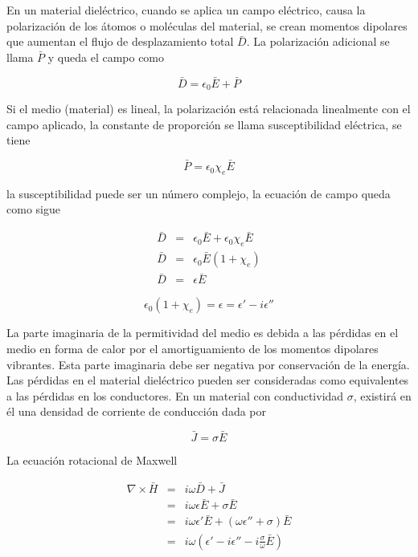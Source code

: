 En un material dieléctrico, cuando se aplica un campo eléctrico, causa la polarización de los átomos o moléculas del material, se crean momentos dipolares que aumentan el flujo de desplazamiento total $\bar{D}$. La polarización adicional se llama $\bar{P}$ y queda el campo como

\begin{equation*}
\bar{D} = \epsilon_0 \bar{E} + \bar{P}
\end{equation*}

Si el medio (material) es lineal, la polarización está relacionada linealmente con el campo aplicado, la constante de proporción se llama susceptibilidad eléctrica, se tiene

\begin{equation*}
\bar{P} = \epsilon_0 \chi_e \bar{E}
\end{equation*}

la susceptibilidad puede ser un número complejo, la ecuación de campo queda como sigue

\begin{eqnarray*}
\bar{D} &=& \epsilon_0 \bar{E} + \epsilon_0 \chi_e \bar{E} \\
\bar{D} &=& \epsilon_0 \bar{E} (1+ \chi_e) \\
\bar{D} &=& \epsilon \bar{E}
\end{eqnarray*}

\begin{equation*}
\epsilon_0(1+ \chi_e) = \epsilon = \epsilon' - i \epsilon''
\end{equation*}

La parte imaginaria de la permitividad del medio es debida a las pérdidas en el medio en forma de calor por el amortiguamiento de los momentos dipolares vibrantes. Esta parte imaginaria debe ser negativa por conservación de la energía. Las pérdidas en el material dieléctrico pueden ser consideradas como equivalentes a las pérdidas en los conductores. En un material con conductividad $\sigma$, existirá en él una densidad de corriente de conducción dada por 

\begin{equation*}
\bar{J} = \sigma \bar{E}
\end{equation*}

La ecuación rotacional de Maxwell

\begin{eqnarray*}
\nabla \times \bar{H} &=& i \omega \bar{D} + \bar{J} \\
&=& i \omega \epsilon \bar{E} +\sigma \bar{E} \\
&=& i \omega \epsilon' \bar{E} + (\omega \epsilon'' + \sigma) \bar{E} \\
&=& i \omega \left( \epsilon' - i \epsilon'' - i \frac{\sigma}{\omega} \bar{E} \right)
\end{eqnarray*}

